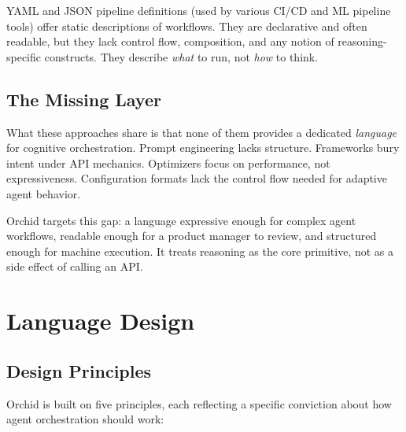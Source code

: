 \documentclass[11pt,a4paper]{article}
\begin{document}
YAML and JSON pipeline definitions (used by various CI/CD and ML pipeline tools) offer static descriptions of workflows. They are declarative and often readable, but they lack control flow, composition, and any notion of reasoning-specific constructs. They describe \emph{what} to run, not \emph{how} to think.

\subsection{The Missing Layer}

What these approaches share is that none of them provides a dedicated \emph{language} for cognitive orchestration. Prompt engineering lacks structure. Frameworks bury intent under API mechanics. Optimizers focus on performance, not expressiveness. Configuration formats lack the control flow needed for adaptive agent behavior.

Orchid targets this gap: a language expressive enough for complex agent workflows, readable enough for a product manager to review, and structured enough for machine execution. It treats reasoning as the core primitive, not as a side effect of calling an API.

\section{Language Design}

\subsection{Design Principles}

Orchid is built on five principles, each reflecting a specific conviction about how agent orchestration should work:
\end{document}
